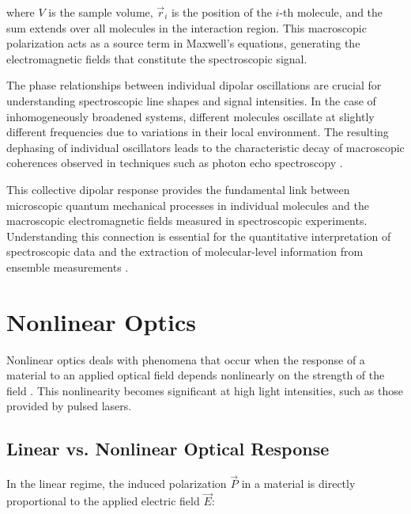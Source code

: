\noindent where $V$ is the sample volume, $\vec{r}_i$ is the position of the $i$-th molecule, and the sum extends over all molecules in the interaction region. This macroscopic polarization acts as a source term in Maxwell's equations, generating the electromagnetic fields that constitute the spectroscopic signal.

\noindent The phase relationships between individual dipolar oscillations are crucial for understanding spectroscopic line shapes and signal intensities. In the case of inhomogeneously broadened systems, different molecules oscillate at slightly different frequencies due to variations in their local environment. The resulting dephasing of individual oscillators leads to the characteristic decay of macroscopic coherences observed in techniques such as photon echo spectroscopy \cite{mukamel1995principlesnonlinearoptical}.

\noindent This collective dipolar response provides the fundamental link between microscopic quantum mechanical processes in individual molecules and the macroscopic electromagnetic fields measured in spectroscopic experiments. Understanding this connection is essential for the quantitative interpretation of spectroscopic data and the extraction of molecular-level information from ensemble measurements \cite{feynman1965feynmanlecturesphysics}.


\section{Nonlinear Optics}
\label{sec:nonlinear_optics}

\noindent Nonlinear optics deals with phenomena that occur when the response of a material to an applied optical field depends nonlinearly on the strength of the field \cite{boyd2008contents}. This nonlinearity becomes significant at high light intensities, such as those provided by pulsed lasers.

\subsection{Linear vs. Nonlinear Optical Response}
\label{subsec:linear_vs_nonlinear}

\noindent In the linear regime, the induced polarization $\vec{P}$ in a material is directly proportional to the applied electric field $\vec{E}$:


